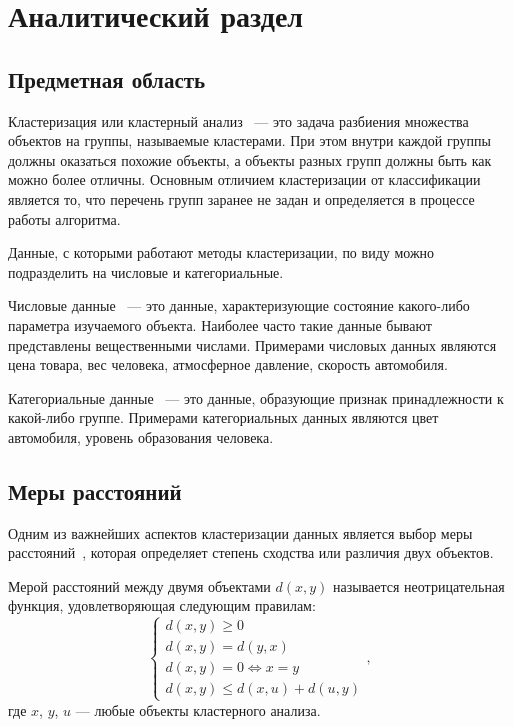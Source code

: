 \chapter{Аналитический раздел}


\section{Предметная область}
Кластеризация или кластерный анализ~\cite{Clast} --- это задача разбиения множества объектов на группы, называемые кластерами. При этом внутри каждой группы должны оказаться похожие объекты, а объекты разных групп должны быть как можно более отличны. Основным отличием кластеризации от классификации является то, что перечень групп заранее не задан и определяется в процессе работы алгоритма.

Данные, с которыми работают методы кластеризации, по виду можно подразделить на числовые и категориальные.

Числовые данные~\cite{data} --- это данные, характеризующие состояние какого-либо параметра изучаемого объекта. Наиболее часто такие данные бывают представлены вещественными числами. Примерами числовых данных являются цена товара, вес человека, атмосферное давление, скорость автомобиля.

Категориальные данные~\cite{data} --- это данные, образующие признак принадлежности к какой-либо группе. Примерами категориальных данных являются цвет автомобиля, уровень образования человека.


\section{Меры расстояний}
Одним из важнейших аспектов кластеризации данных является выбор меры расстояний~\cite{Metrics}, которая определяет степень сходства или различия двух объектов.

Мерой расстояний между двумя объектами $d(x, y)$ называется неотрицательная функция, удовлетворяющая следующим правилам:
\begin{equation}
	\begin{cases}
		d(x, y) \geqslant 0 \\
		d(x, y) = d(y, x) \\
		d(x, y) = 0 \iff x = y \\
		d(x, y) \leqslant d(x, u) + d(u, y)
	\end{cases},
\end{equation} 
где $x$, $y$, $u$ --- любые объекты кластерного анализа.

